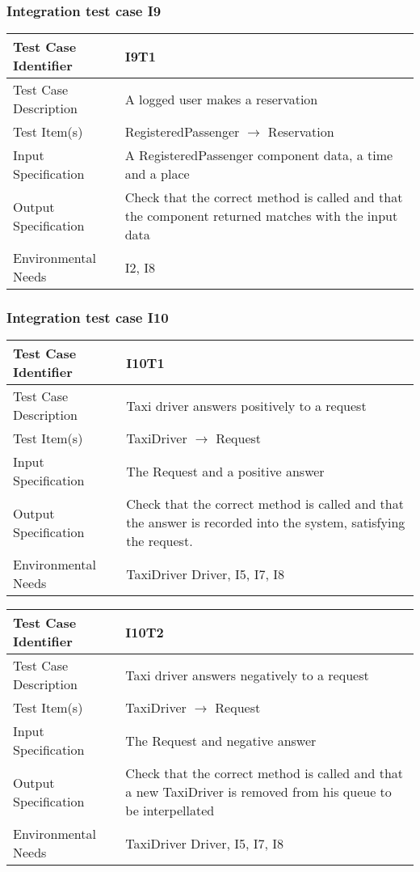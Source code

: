 		\subsubsection{Integration test case I9}
		\begin{center}
			\begin{tabular}{ |l p{10cm}| } \hline
				Test Case Identifier & I9T1 \\ \hline
				Test Case Description & A logged user makes a reservation \\ \hline
				Test Item(s) & RegisteredPassenger $\rightarrow$ Reservation \\ \hline
				Input Specification & A RegisteredPassenger component data, a time and a place \\ \hline
				Output Specification & Check that the correct method is called and that the component returned matches
				with the input data \\ \hline
				Environmental Needs & I2, I8 \\ \hline
			\end{tabular}
		\end{center}
		\subsubsection{Integration test case I10}
		\begin{center}
			\begin{tabular}{ |l p{10cm}| } \hline
				Test Case Identifier & I10T1 \\ \hline
				Test Case Description & Taxi driver answers positively to a request \\ \hline
				Test Item(s) & TaxiDriver $\rightarrow$ Request \\ \hline
				Input Specification & The Request and a positive answer \\ \hline
				Output Specification & Check that the correct method is called and that the answer is recorded
				into the system, satisfying the request. \\ \hline
				Environmental Needs & TaxiDriver Driver, I5, I7, I8 \\ \hline
			\end{tabular}
			\begin{tabular}{ |l p{10cm}| } \hline
				Test Case Identifier & I10T2 \\ \hline
				Test Case Description & Taxi driver answers negatively to a request \\ \hline
				Test Item(s) & TaxiDriver $\rightarrow$ Request \\ \hline
				Input Specification & The Request and negative answer \\ \hline
				Output Specification & Check that the correct method is called and that a new TaxiDriver is
				removed from his queue to be interpellated \\ \hline
				Environmental Needs & TaxiDriver Driver, I5, I7, I8 \\ \hline
			\end{tabular}
		\end{center}
